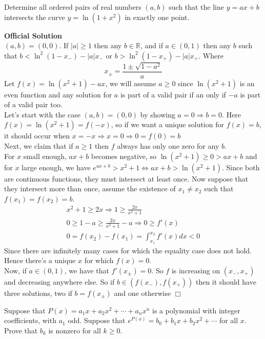 \begin{problem}[D][10][Putnam 2022 /A1]
    Determine all ordered pairs of real numbers $(a, b)$ such that the line $y = ax + b$ intersects the curve $y = \ln(1 + x^2)$ in exactly one point.
\end{problem}
\vskip 3mm
\textbf{Official Solution}\\
    $(a,b)=(0,0)$. If $|a| \geq 1$ then any $b \in \mathbb{R}$, and if $a \in (0,1)$ then any $b$ such that $b < \ln^2(1-x_-)-|a|x_-$ or $b> \ln^2(1-x_+)-|a|x_+$. Where
    $$ x_\pm = \frac{1\pm \sqrt{1-a^2}}{a}$$
    Let $f(x)=\ln(x^2+1)-ax$, we will assume $a \geq 0$ since $\ln(x^2+1)$ is an even function and any solution for $a$ is part of a valid pair if an only if $-a$ is part of a valid pair too.\vspace{7pt} \\
    Let's start with the case $(a,b)=(0,0)$ by showing $a=0 \Rightarrow b=0$. Here $f(x)=\ln(x^2+1)=f(-x)$, so if we want a unique solution for $f(x)=b$, it should occur when $x=-x \Rightarrow x=0 \Rightarrow 0=f(0)=b$ \vspace{7pt} \\
    Next, we claim that if $a \geq 1$ then $f$ always has only one zero for any $b$.\\
    For $x$ small enough, $ax+b$ becomes negative, so $\ln(x^2+1)\geq 0 > ax+b$ and
    for $x$ large enough, we have $e^{ax+b}>x^2+1 \iff ax+b>\ln(x^2+1)$. Since both are continuous functions, they must intersect at least once. Now suppose that they intersect more than once, assume the existence of $x_1 \neq x_2$ such that $f(x_1)=f(x_2)=b$.
    \begin{align*}
    x^2+1 \geq 2x \Rightarrow 1 \geq \frac{2x}{x^2+1}  \\
    0 \geq 1-a \geq \frac{2x}{x^2+1}-a \Rightarrow 0 \geq f'(x) \\ 
    0=f(x_2)-f(x_1)=\int_{x_1}^{x_2} f'(x)dx < 0 
    \end{align*}
    Since there are infinitely many cases for which the equality case does not hold. Hence there's a unique $x$ for which $f(x)=0$. \vspace{7pt} \\
    Now, if $a \in (0,1)$, we have that $f'(x_\pm)=0$. So $f$ is increasing on $(x_-,x_+)$ and decreasing anywhere else. So if $b \in (f(x_-),f(x_+))$ then it should have three solutions, two if $b=f(x_\pm)$ and one otherwise $\Box$


\begin{problem}[D][7][Putnam 2022 /B1]
    Suppose that $P(x) = a_1x + a_2x^2 + \cdots + a_nx^n$ is a polynomial with integer coefficients, with $a_1$ odd. Suppose that $e^{P(x)} = b_0 + b_1x + b_2x^2 + \cdots$ for all $x$. Prove that $b_k$ is nonzero for all $k \geq 0$.
\end{problem}

